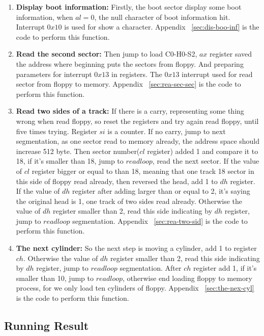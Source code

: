 \documentclass{swfcthesis}
\begin{document}
\begin{enumerate}
\item \textbf{Display boot information:} Firstly, the boot sector display some boot information,
  when $al=0$, the null character of boot information hit. Interrupt $0x10$ is used for
  show a character. Appendix ~\ref{sec:dis-boo-inf} is the code to perform this function.
\item \textbf{Read the second sector:} Then jump to load C0-H0-S2, $ax$ register saved the address
  where beginning puts the sectors from floppy. And preparing parameters for interrupt
  $0x13$ in registers. The $0x13$ interrupt used for read sector from floppy to
  memory. Appendix ~\ref{sec:rea-sec-sec} is the code to perform this function.
\item \textbf{Read two sides of a track:} If there is a carry, representing some thing wrong when
  read floppy, so reset the registers and try again read floppy, until five times
  trying. Register $si$ is a counter. If no carry, jump to next segmentation, as one
  sector read to memory already, the address space should increase 512 byte. Then sector
  number($cl$ register) added 1 and compare it to 18, if it's smaller than 18, jump to
  $readloop$, read the next sector. If the value of $cl$ register bigger or equal to than
  18, meaning that one track 18 sector in this side of floppy read already, then reversed
  the head, add 1 to $dh$ register. If the value of $dh$ register after adding larger than
  or equal to 2, it's saying the original head is 1, one track of two sides read
  already. Otherwise the value of $dh$ register smaller than 2, read this side indicating
  by $dh$ register, jump to $readloop$ segmentation. Appendix ~\ref{sec:rea-two-sid} is
  the code to perform this function.
\item \textbf{The next cylinder:} So the next step is moving a cylinder, add 1 to register
  $ch$. Otherwise the value of $dh$ register smaller than 2, read this side indicating by
  $dh$ register, jump to $readloop$ segmentation. After $ch$ register add 1, if it's
  smaller than 10, jump to $readloop$, otherwise end loading floppy to memory process, for
  we only load ten cylinders of floppy. Appendix ~\ref{sec:the-nex-cyl} is the code to
  perform this function.
\end{enumerate}

\subsection{Running Result}
\label{sec:running-result}
\end{document}
